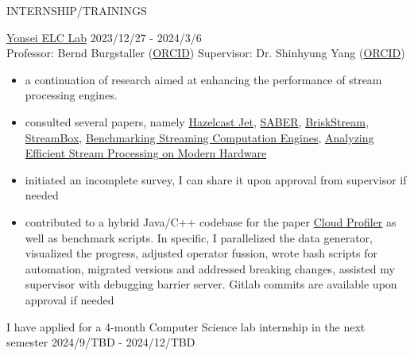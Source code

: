 \documentclass{resume} %
\begin{document}
\begin{rSection}{INTERNSHIP/TRAININGS} 

\href{https://elc.yonsei.ac.kr/}{Yonsei ELC Lab} \hfill 2023/12/27 - 2024/3/6 \\ 
Professor: Bernd Burgstaller (\href{https://orcid.org/0000-0002-0374-8853}{ORCID}) 
\qquad Supervisor: Dr. Shinhyung Yang (\href{https://orcid.org/0000-0002-8997-9942}{ORCID})
\begin{itemize}
\item a continuation of research aimed at enhancing the performance of stream processing engines.
\item consulted several papers, namely 
\href{https://arxiv.org/abs/2103.10169}{Hazelcast Jet},
\href{https://raulcastrofernandez.com/papers/sigmod16-saber.pdf}{SABER},
\href{https://arxiv.org/abs/1904.03604}{BriskStream},
\href{https://www.usenix.org/system/files/conference/atc17/atc17-miao.pdf}{StreamBox},
\href{https://ieeexplore.ieee.org/document/7530084}{Benchmarking Streaming Computation Engines},
\href{https://dl.acm.org/doi/10.14778/3303753.3303758}{Analyzing Efficient Stream Processing on Modern Hardware}
\item initiated an incomplete survey, I can share it upon approval from supervisor if needed
\item contributed to a hybrid Java/C++ codebase for the paper
\href{https://arxiv.org/abs/2205.09325}{Cloud Profiler} as well as benchmark
scripts. In specific, I parallelized the data generator, visualized the
progress, adjusted operator fussion, wrote bash scripts for automation,
migrated versions and addressed breaking changes, assisted my supervisor with
debugging barrier server. Gitlab commits are available upon approval if needed
\end{itemize}
{I have applied for a 4-month Computer Science lab internship in the next semester}       
\hfill 2024/9/TBD - 2024/12/TBD

\end{rSection} 

\end{document}
